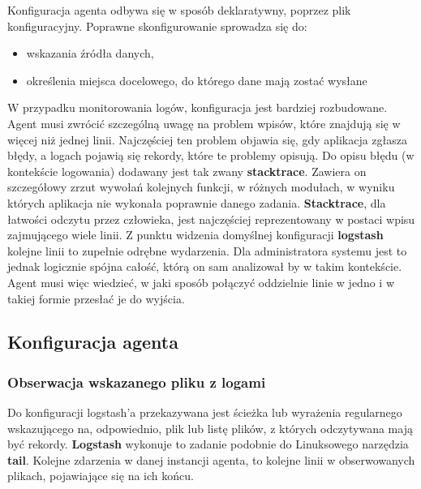     Konfiguracja agenta odbywa się w sposób deklaratywny, poprzez plik konfiguracyjny. Poprawne
    skonfigurowanie sprowadza się do:
    \begin{itemize}
        \item wskazania źródła danych,
        \item określenia miejsca docelowego, do którego dane mają zostać wysłane
    \end{itemize}
    W przypadku monitorowania logów, konfiguracja jest bardziej rozbudowane.
    Agent musi zwrócić szczególną uwagę na problem wpisów, które znajdują się w więcej niż jednej linii.
    Najczęściej ten problem objawia się, gdy aplikacja zgłasza błędy, a logach pojawią się rekordy, które
    te problemy opisują. Do opisu błędu (w kontekście logowania) dodawany jest tak zwany \textbf{stacktrace}.
    Zawiera on szczegółowy zrzut wywołań kolejnych funkcji, w różnych modułach, w wyniku których aplikacja
    nie wykonała poprawnie danego zadania. \textbf{Stacktrace}, dla łatwości odczytu przez człowieka,
    jest najczęściej reprezentowany w postaci wpisu zajmującego wiele linii. Z punktu widzenia domyślnej
    konfiguracji \textbf{logstash} kolejne linii to zupełnie odrębne wydarzenia. Dla administratora systemu jest
    to jednak logicznie spójna całość, którą on sam analizował by w takim kontekście. Agent musi więc wiedzieć,
    w jaki sposób połączyć oddzielnie linie w jedno i w takiej formie przesłać je do wyjścia.
    
    \subsection{Konfiguracja agenta}
        \label{chapter:monasca:monasca_log_agent:configuration}
        
        \subsubsection{Obserwacja wskazanego pliku z logami}
            Do konfiguracji logstash'a przekazywana jest ścieżka lub wyrażenia regularnego wskazującego
            na, odpowiednio, plik lub listę plików, z których odczytywana mają być rekordy. \textbf{Logstash}
            wykonuje to zadanie podobnie do Linuksowego narzędzia \textbf{tail}. Kolejne zdarzenia w danej 
            instancji agenta, to kolejne linii w obserwowanych plikach, pojawiające się na ich końcu. 
        
